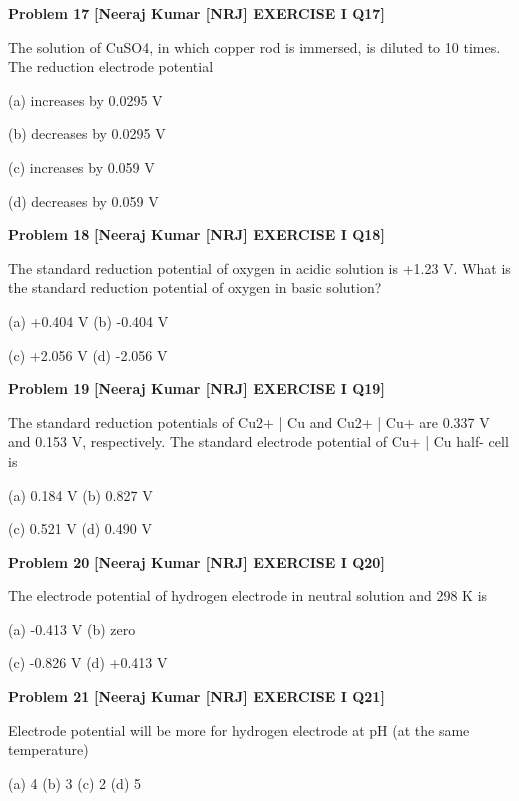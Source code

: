 \begin{problembox}
\textbf{Problem 17} \hfill \textbf{[Neeraj Kumar [NRJ] EXERCISE I Q17]}
\label{q:ext-nrj_all_questions-17}

The solution of CuSO4, in which copper rod is 
immersed, is diluted to 10 times. The reduction 
electrode potential
 
 (a) increases by 0.0295 V
 
 (b) decreases by 0.0295 V
 
 (c) increases by 0.059 V
 
 (d) decreases by 0.059 V
\end{problembox}

\begin{problembox}
\textbf{Problem 18} \hfill \textbf{[Neeraj Kumar [NRJ] EXERCISE I Q18]}
\label{q:ext-nrj_all_questions-18}

The standard reduction potential of oxygen in 
acidic solution is +1.23 V. What is the standard 
reduction potential of oxygen in basic solution?
 
 (a) +0.404 V 
(b) -0.404 V
 
 (c) +2.056 V 
(d) -2.056 V
\end{problembox}

\begin{problembox}
\textbf{Problem 19} \hfill \textbf{[Neeraj Kumar [NRJ] EXERCISE I Q19]}
\label{q:ext-nrj_all_questions-19}

The standard reduction potentials of Cu2+ | Cu and 
Cu2+ | Cu+ are 0.337 V and 0.153 V, respectively. 
The standard electrode potential of Cu+ | Cu half-
cell is
 
 (a) 0.184 V 
(b) 0.827 V
 
 (c) 0.521 V 
(d) 0.490 V
\end{problembox}

\begin{problembox}
\textbf{Problem 20} \hfill \textbf{[Neeraj Kumar [NRJ] EXERCISE I Q20]}
\label{q:ext-nrj_all_questions-20}

The electrode potential of hydrogen electrode in 
neutral solution and 298 K is
 
 (a) -0.413 V 
(b) zero
 
 (c) -0.826 V 
(d) +0.413 V
\end{problembox}

\begin{problembox}
\textbf{Problem 21} \hfill \textbf{[Neeraj Kumar [NRJ] EXERCISE I Q21]}
\label{q:ext-nrj_all_questions-21}

Electrode potential will be more for hydrogen 
electrode at pH (at the same temperature)
 
 (a) 4   (b) 3   (c) 2   (d) 5
\end{problembox}

